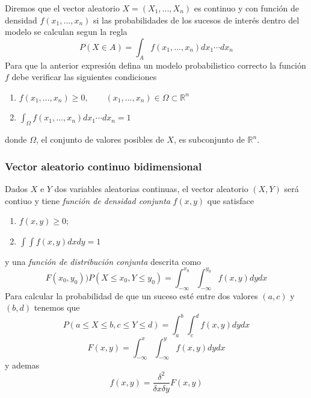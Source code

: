 Diremos que el vector aleatorio \(X = (X_1, ..., X_n)\) es continuo y con 
función de densidad \(f(x_1, ..., x_n)\) si las probabilidades de los
sucesos de interés dentro del modelo se calculan segun la regla
\[P(X \in A) = \int_A f(x_1, ..., x_n)dx_1 \dotsi dx_n\]
Para que la anterior expresión defina un modelo probabilistico correcto
la función \(f\) debe verificar las siguientes condiciones
\begin{enumerate}
    \item \(f(x_1, ..., x_n) \geq 0, \qquad (x_1, ..., x_n) \in \Omega \subset \mathbb{R}^n\)
    \item \(\int_\Omega f(x_1, ..., x_n) dx_1 \dotsi dx_n = 1\)
\end{enumerate}
donde \(\Omega\), el conjunto de valores posibles de \(X\), es subconjunto
de \(\mathbb{R}^n\).
\subsubsection{Vector aleatorio continuo bidimensional}
Dados \(X\) e \(Y\) dos variables aleatorias continuas, el vector 
aleatorio \((X, Y)\) será contiuo y tiene \textit{función de densidad 
conjunta} \(f(x, y)\) que satisface
\begin{enumerate}
    \item \(f(x, y) \geq 0;\)
    \item \(\int\int f(x, y)dx dy = 1\)
\end{enumerate}
y una \textit{función de distribución conjunta} descrita como
\[F(x_0, y_0) ) P(X \leq x_0, Y \leq y_0) =  \int_{-\infty}^{x_0}\int_{-\infty}^{y_0} f(x, y)dy dx\]
Para calcular la probabilidad de que un suceso esté entre dos valores \((a, c)\) y \((b, d)\) tenemos que
\[P(a \leq X \leq b, c \leq Y \leq d) = \int_{a}^{b}\int_{c}^{d}f(x, y)dydx\]
\[F(x, y) = \int_{-\infty}^{x}\int_{-\infty}^{y} f(x, y)dydx\]
y ademas
\[f(x, y) = \frac{\delta^2}{\delta x\delta y}F(x, y)\]

\newpage

